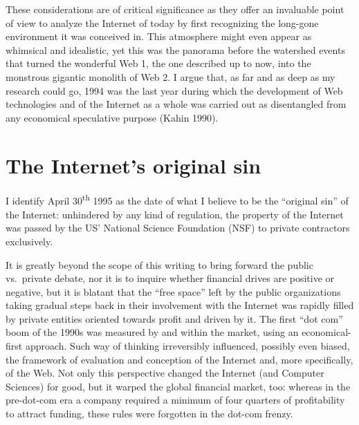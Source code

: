 \documentclass[
  a4paper,
]{book}
\begin{document}
These considerations are of critical significance as they offer an invaluable point of view to analyze the Internet of today by first recognizing the long-gone environment it was conceived in. This atmosphere might even appear as whimsical and idealistic, yet this was the panorama before the watershed events that turned the wonderful Web 1, the one described up to now, into the monstrous gigantic monolith of Web 2. I argue that, as far and as deep as my research could go, 1994 was the last year during which the development of Web technologies and of the Internet as a whole was carried out as disentangled from any economical speculative purpose {(Kahin 1990)}.

\hypertarget{the-internets-original-sin}{%
\section{The Internet's original sin}\label{the-internets-original-sin}}

I identify April 30\textsuperscript{th} 1995 as the date of what I believe to be the ``original sin'' of the Internet: unhindered by any kind of regulation, the property of the Internet was passed by the US' National Science Foundation (NSF) to private contractors exclusively.

It is greatly beyond the scope of this writing to bring forward the public vs.~private debate, nor it is to inquire whether financial drives are positive or negative, but it is blatant that the ``free space'' left by the public organizations taking gradual steps back in their involvement with the Internet was rapidly filled by private entities oriented towards profit and driven by it. The first ``dot com'' boom of the 1990s was measured by and within the market, using an economical-first approach. Such way of thinking irreversibly influenced, possibly even biased, the framework of evaluation and conception of the Internet and, more specifically, of the Web. Not only this perspective changed the Internet (and Computer Sciences) for good, but it warped the global financial market, too: whereas in the pre-dot-com era a company required a minimum of four quarters of profitability to attract funding, these rules were forgotten in the dot-com frenzy.
\end{document}
